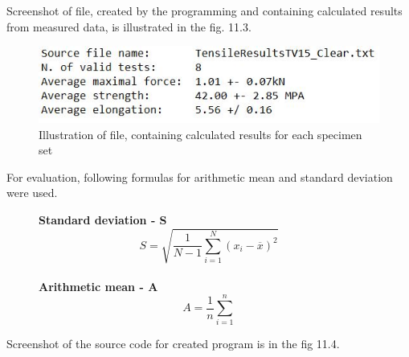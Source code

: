 \documentclass[a4paper, 11pt, reqno]{report}
\begin{document}
Screenshot of file, created by the programming and containing calculated results from measured data, is illustrated in the fig. 11.3.

\begin{figure}[h]
\centering
\includegraphics[scale=1]{tensileDataResults}
\caption{Illustration of file, containing calculated results for each specimen set}
\end{figure}

For evaluation, following formulas for arithmetic mean and standard deviation were used.


\begin{figure}[h]
\centering
\textbf{Standard deviation - S\\}
\begin{equation}
S = \sqrt{\frac{1}{N-1} \sum_{i=1}^N (x_i - \overline{x})^2}
\end{equation}
%
\\[10pt]
%
\textbf{Arithmetic mean - A\\}
\begin{equation}
A=\frac{1}{n}\sum_{i=1}^n
\end{equation}
%
\end{figure}
Screenshot of the source code for created program is in the fig 11.4.
\end{document}
